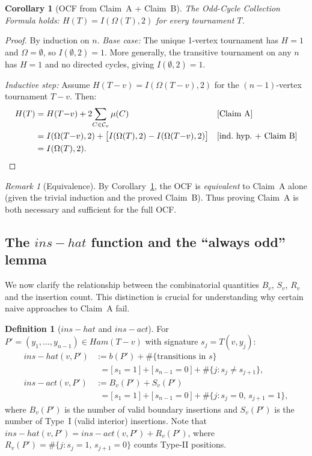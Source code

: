 \documentclass[12pt,reqno]{amsart}
\theoremstyle{plain}
\newtheorem{corollary}[theorem]{Corollary}
\theoremstyle{definition}
\newtheorem{definition}[theorem]{Definition}
\theoremstyle{remark}
\newtheorem{remark}[theorem]{Remark}
\newcommand{\Ham}{\mathrm{Ham}}
\newcommand{\iverson}[1]{\bigl[\,#1\,\bigr]}
\newcommand{\inshat}{\widehat{\mathrm{ins}}}
\newcommand{\insact}{\mathrm{ins}_{\mathrm{act}}}
\renewcommand{\Ham}{Ham}%
\renewcommand{\inshat}{ins-hat}%
\renewcommand{\insact}{ins-act}%
\begin{document}
\begin{corollary}[OCF from Claim~A + Claim~B]\label{cor:ocf_induction}
The Odd-Cycle Collection Formula holds: $H(T) = I(\Omega(T), 2)$
for every tournament $T$.
\end{corollary}
\begin{proof}
By induction on $n$. \emph{Base case:} The unique 1-vertex tournament has
$H = 1$ and $\Omega = \emptyset$, so $I(\emptyset, 2) = 1$. More generally, the
transitive tournament on any $n$ has $H = 1$ and no directed cycles, giving
$I(\emptyset, 2) = 1$. \checkmark

\emph{Inductive step:} Assume $H(T{-}v) = I(\Omega(T{-}v), 2)$ for the
$(n-1)$-vertex tournament $T{-}v$. Then:
\begin{align*}
  H(T) &= H(T{-}v) + 2\!\sum_{C \in \mathcal{C}_v}\mu(C)
             && \text{[Claim~A]}\\
       &= I(\Omega(T{-}v),2) + \bigl[I(\Omega(T),2) - I(\Omega(T{-}v),2)\bigr]
             && \text{[ind.\ hyp.\ + Claim~B]}\\
       &= I(\Omega(T),2). \qedhere
\end{align*}
\end{proof}

\begin{remark}[Equivalence]
By Corollary~\ref{cor:ocf_induction}, the OCF is \emph{equivalent} to Claim~A
alone (given the trivial induction and the proved Claim~B). Thus proving Claim~A
is both necessary and sufficient for the full OCF.
\end{remark}

\subsection{The $\inshat$ function and the ``always odd'' lemma}
\label{subsec:inshat}

We now clarify the relationship between the combinatorial quantities $B_v$,
$S_v$, $R_v$ and the insertion count. This distinction is crucial for
understanding why certain naive approaches to Claim~A fail.

\begin{definition}[$\inshat$ and $\insact$]\label{def:ins_functions}
For $P' = (y_1, \ldots, y_{n-1}) \in \Ham(T{-}v)$ with signature $s_j = T(v,y_j)$:
\begin{align*}
  \inshat(v, P') &:= b(P') + \#\{\text{transitions in }s\}\\
   &\phantom{:}= \iverson{s_1=1} + \iverson{s_{n-1}=0} + \#\{j : s_j \neq s_{j+1}\},\\
  \insact(v, P') &:= B_v(P') + S_v(P')\\
   &\phantom{:}= \iverson{s_1=1} + \iverson{s_{n-1}=0} + \#\{j : s_j=0,\, s_{j+1}=1\},
\end{align*}
where $B_v(P')$ is the number of valid boundary insertions and $S_v(P')$ is the
number of Type~I (valid interior) insertions. Note that
$\inshat(v,P') = \insact(v,P') + R_v(P')$,
where $R_v(P') = \#\{j:s_j=1,\,s_{j+1}=0\}$ counts Type-II positions.
\end{definition}
\end{document}
